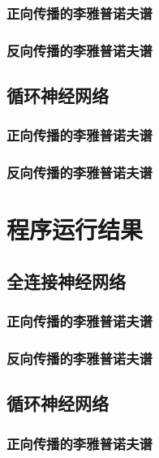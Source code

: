\documentclass[12pt,a4paper]{amsart}
\begin{document}
\subsubsection{正向传播的李雅普诺夫谱}

\subsubsection{反向传播的李雅普诺夫谱}

\subsection{循环神经网络}

\subsubsection{正向传播的李雅普诺夫谱}

\subsubsection{反向传播的李雅普诺夫谱}

\section{程序运行结果} \label{sec:result}

\subsection{全连接神经网络}

\subsubsection{正向传播的李雅普诺夫谱}

\subsubsection{反向传播的李雅普诺夫谱}

\subsection{循环神经网络}

\subsubsection{正向传播的李雅普诺夫谱}
\end{document}
